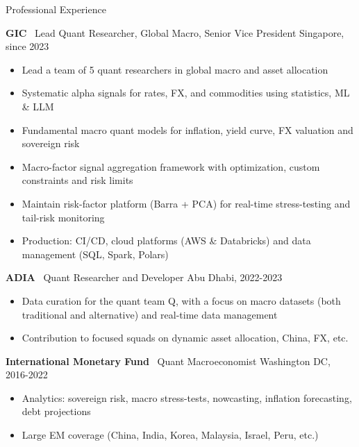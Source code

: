 \documentclass[usegeometry, 10pt, a4paper]{cv} %
\newcommand{\activite}[1]{\textbf{#1}\ }
\begin{document}
\begin{rubriquetableau}[0.95\textwidth]{Professional Experience}\\
\vspace{-0.5cm}

\activite{GIC} Lead Quant Researcher, Global Macro, Senior Vice President \hfill
Singapore, since 2023 \\ \vspace{-0.4cm}
\begin{itemize}
  \item Lead a team of 5 quant researchers in global macro and asset allocation
  \item Systematic alpha signals for rates, FX, and commodities using statistics, ML \& LLM
  \item Fundamental macro quant models for inflation, yield curve, FX valuation and sovereign risk
  \item Macro-factor signal aggregation framework with optimization, custom constraints and risk limits
  \item Maintain risk-factor platform (Barra + PCA) for real-time stress-testing and tail-risk monitoring
  \item Production: CI/CD, cloud platforms (AWS \& Databricks) and data management (SQL, Spark, Polars) 
\end{itemize} 

\vspace{0.4cm}

\activite{ADIA} Quant Researcher and Developer  \hfill
Abu Dhabi, 2022-2023 \\ \vspace{-0.2cm}
\begin{itemize}[]
\item Data curation for the quant team Q, with a focus on macro datasets (both traditional and alternative) and real-time data management
\item Contribution to focused squads on dynamic asset allocation, China, FX, etc. 
 \end{itemize}
 
\vspace{0.4cm}

\activite{International Monetary Fund} Quant Macroeconomist \hfill Washington DC, 2016-2022 \\
\vspace{-0.2cm}

\begin{itemize}[]
  \item Analytics: sovereign risk, macro stress-tests, nowcasting, inflation forecasting, debt projections
  \item Large EM coverage (China, India, Korea, Malaysia, Israel, Peru, etc.)
  \end{itemize}  
\vspace{0.4cm}


\end{rubriquetableau}
\end{document}
